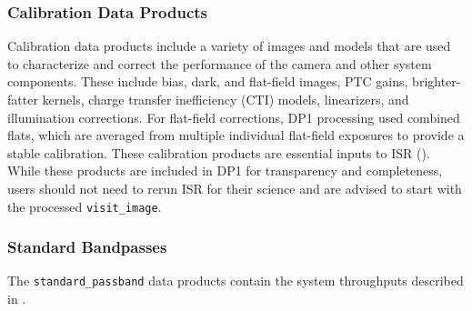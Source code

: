 \subsubsection{Calibration Data Products}
\label{ssec:calibration_data}
Calibration data products include a variety of images and models that are used to characterize and correct the performance of the camera and other system components. 
These include bias, dark, and flat-field images, PTC gains, brighter-fatter kernels, charge transfer inefficiency (CTI) models, linearizers, and illumination corrections. 
For flat-field corrections, DP1 processing used combined flats, which are averaged from multiple individual flat-field exposures to provide a stable calibration. These calibration products are essential inputs to \gls{ISR} (). While these products are included in DP1 for transparency and completeness, users should not need to rerun ISR for their science and are advised to start with the processed \texttt{visit\_image}.

\subsubsection{Standard Bandpasses}
\label{ssec:bandpasses_dataproducts}
The \texttt{standard\_passband} data products contain the system throughputs described in .

% 
 






